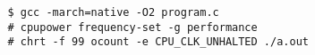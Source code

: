 
\begin{verbatim}
   $ gcc -march=native -O2 program.c
   # cpupower frequency-set -g performance
   # chrt -f 99 ocount -e CPU_CLK_UNHALTED ./a.out
\end{verbatim}




